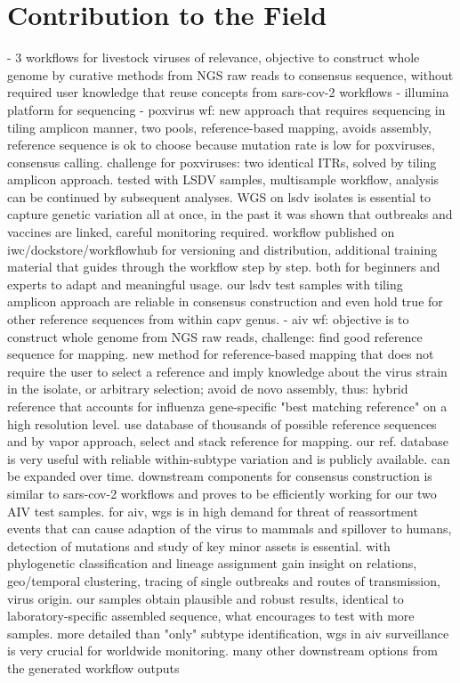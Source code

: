\section{Contribution to the Field}
\todoit
- 3 workflows for livestock viruses of relevance, objective to construct whole genome by curative methods from NGS raw reads to consensus sequence, without required user knowledge that reuse concepts from sars-cov-2 workflows 
- illumina platform for sequencing
- poxvirus wf: new approach that requires sequencing in tiling amplicon manner, two pools, reference-based mapping, avoids assembly, reference sequence is ok to choose because mutation rate is low for poxviruses, consensus calling. challenge for poxviruses: two identical ITRs, solved by tiling amplicon approach. tested with LSDV samples, multisample workflow, analysis can be continued by subsequent analyses. WGS on lsdv isolates is essential to capture genetic variation all at once, in the past it was shown that outbreaks and vaccines are linked, careful monitoring required. workflow published on iwc/dockstore/workflowhub for versioning and distribution, additional training material that guides through the workflow step by step. both for beginners and experts to adapt and meaningful usage. our lsdv test samples with tiling amplicon approach are reliable in consensus construction and even hold true for other reference sequences from within capv genus. 
- aiv wf: objective is to construct whole genome from NGS raw reads, challenge: find good reference sequence for mapping. new method for reference-based mapping that does not require the user to select a reference and imply knowledge about the virus strain in the isolate, or arbitrary selection; avoid de novo assembly, thus: hybrid reference that accounts for influenza gene-specific "best matching reference" on a high resolution level. use database of thousands of possible reference sequences and by vapor approach, select and stack reference for mapping. our ref. database is very useful with reliable within-subtype variation and is publicly available. can be expanded over time. downstream components for consensus construction is similar to sars-cov-2 workflows and proves to be efficiently working for our two AIV test samples. for aiv, wgs is in high demand for threat of reassortment events that can cause adaption of the virus to mammals and spillover to humans, detection of mutations and study of key minor assets is essential. with phylogenetic classification and lineage assignment gain insight on relations, geo/temporal clustering, tracing of single outbreaks and routes of transmission, virus origin. our samples obtain plausible and robust results, identical to laboratory-specific assembled sequence, what encourages to test with more samples. more detailed than "only" subtype identification, wgs in aiv surveillance is very crucial for worldwide monitoring. many other downstream options from the generated workflow outputs
